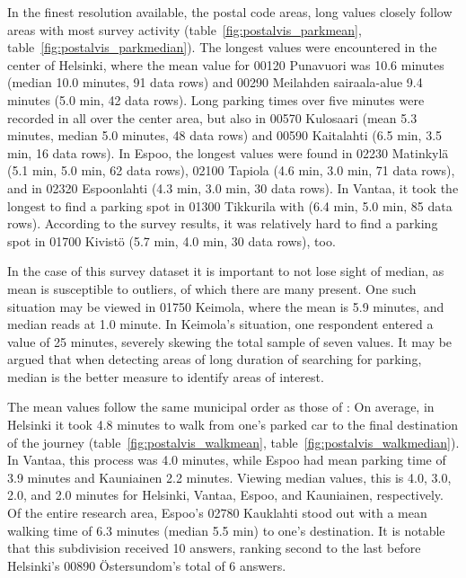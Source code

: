 In the finest resolution available, the postal code areas, long  values closely follow areas with most survey activity (table~\ref{fig:postalvis_parkmean}, table~\ref{fig:postalvis_parkmedian}). The longest  values were encountered in the center of Helsinki, where the mean value for 00120 Punavuori was 10.6 minutes (median 10.0 minutes, 91 data rows) and 00290 Meilahden sairaala-alue 9.4 minutes (5.0 min, 42 data rows). Long parking times over five minutes were recorded in all over the center area, but also in 00570 Kulosaari (mean 5.3 minutes, median 5.0 minutes, 48 data rows) and 00590 Kaitalahti (6.5 min, 3.5 min, 16 data rows). In Espoo, the longest  values were found in 02230 Matinkylä (5.1 min, 5.0 min, 62 data rows), 02100 Tapiola (4.6 min, 3.0 min, 71 data rows), and in 02320 Espoonlahti (4.3 min, 3.0 min, 30 data rows). In Vantaa, it took the longest to find a parking spot in 01300 Tikkurila with (6.4 min, 5.0 min, 85 data rows). According to the survey results, it was relatively hard to find a parking spot in 01700 Kivistö (5.7 min, 4.0 min, 30 data rows), too.

In the case of this survey dataset it is important to not lose sight of median, as mean is susceptible to outliers, of which there are many present. One such situation may be viewed in 01750 Keimola, where the mean  is 5.9 minutes, and median reads at 1.0 minute. In Keimola's situation, one respondent entered a  value of 25 minutes, severely skewing the total sample of seven values. It may be argued that when detecting areas of long duration of searching for parking, median is the better measure to identify areas of interest.

The mean  values follow the same municipal order as those of : On average, in Helsinki it took 4.8 minutes to walk from one's parked car to the final destination of the journey (table~\ref{fig:postalvis_walkmean}, table~\ref{fig:postalvis_walkmedian}). In Vantaa, this process was 4.0 minutes, while Espoo had mean parking time of 3.9 minutes and Kauniainen 2.2 minutes. Viewing median values, this is 4.0, 3.0, 2.0, and 2.0 minutes for Helsinki, Vantaa, Espoo, and Kauniainen, respectively. Of the entire research area, Espoo's 02780 Kauklahti stood out with a mean walking time of 6.3 minutes (median 5.5 min) to one's destination. It is notable that this subdivision received 10 answers, ranking second to the last before Helsinki's 00890 Östersundom's total of 6 answers.

